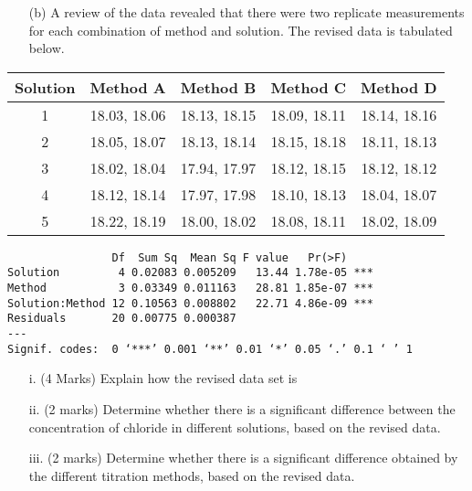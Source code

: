 \documentclass[a4paper,12pt]{article}
\begin{document}
\begin{itemize}
\item[(b)] A review of the data revealed that there were two replicate measurements for each combination of method and solution. The revised data is tabulated below.
\end{itemize}

    \begin{tabular}{|c|c|c|c|c|}
      \hline

      Solution &  Method A & Method B & Method C & Method D \\\hline
1&	18.03, 18.06	&	18.13, 18.15	&	18.09, 18.11	&	18.14, 18.16	\\
2&	18.05, 18.07	&	18.13, 18.14	&	18.15, 18.18	&	18.11, 18.13	\\
3&	18.02, 18.04	&	17.94, 17.97	&	18.12, 18.15	&	18.12, 18.12	\\
4&	18.12, 18.14	&	17.97, 17.98	&	18.10, 18.13	&	18.04, 18.07	\\
5&	18.22, 18.19	&	18.00, 18.02	&	18.08, 18.11	&	18.02, 18.09	\\
      \hline
    \end{tabular}

\begin{framed}
\begin{verbatim}
                Df  Sum Sq  Mean Sq F value   Pr(>F)
Solution         4 0.02083 0.005209   13.44 1.78e-05 ***
Method           3 0.03349 0.011163   28.81 1.85e-07 ***
Solution:Method 12 0.10563 0.008802   22.71 4.86e-09 ***
Residuals       20 0.00775 0.000387
---
Signif. codes:  0 ‘***’ 0.001 ‘**’ 0.01 ‘*’ 0.05 ‘.’ 0.1 ‘ ’ 1
\end{verbatim}
\end{framed}

\begin{itemize}
\item[i.] (4 Marks) Explain how the revised data set is
\item[ii.] (2 marks) Determine whether there is a significant difference between the concentration of chloride in different solutions, based on the revised data.
\item[iii.] (2 marks) Determine whether there is a  significant difference obtained by the different titration methods, based on the revised data.

\end{itemize}
\end{document}
